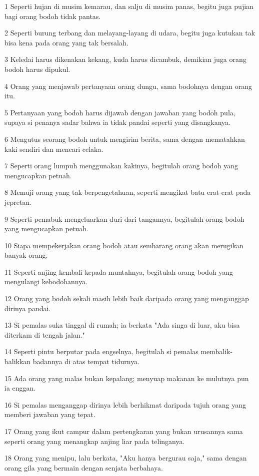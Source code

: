 \par 1 Seperti hujan di musim kemarau, dan salju di musim panas, begitu juga pujian bagi orang bodoh tidak pantas.
\par 2 Seperti burung terbang dan melayang-layang di udara, begitu juga kutukan tak bisa kena pada orang yang tak bersalah.
\par 3 Keledai harus dikenakan kekang, kuda harus dicambuk, demikian juga orang bodoh harus dipukul.
\par 4 Orang yang menjawab pertanyaan orang dungu, sama bodohnya dengan orang itu.
\par 5 Pertanyaan yang bodoh harus dijawab dengan jawaban yang bodoh pula, supaya si penanya sadar bahwa ia tidak pandai seperti yang disangkanya.
\par 6 Mengutus seorang bodoh untuk mengirim berita, sama dengan mematahkan kaki sendiri dan mencari celaka.
\par 7 Seperti orang lumpuh menggunakan kakinya, begitulah orang bodoh yang mengucapkan petuah.
\par 8 Memuji orang yang tak berpengetahuan, seperti mengikat batu erat-erat pada jepretan.
\par 9 Seperti pemabuk mengeluarkan duri dari tangannya, begitulah orang bodoh yang mengucapkan petuah.
\par 10 Siapa mempekerjakan orang bodoh atau sembarang orang akan merugikan banyak orang.
\par 11 Seperti anjing kembali kepada muntahnya, begitulah orang bodoh yang mengulangi kebodohannya.
\par 12 Orang yang bodoh sekali masih lebih baik daripada orang yang menganggap dirinya pandai.
\par 13 Si pemalas suka tinggal di rumah; ia berkata "Ada singa di luar, aku bisa diterkam di tengah jalan."
\par 14 Seperti pintu berputar pada engselnya, begitulah si pemalas membalik-balikkan badannya di atas tempat tidurnya.
\par 15 Ada orang yang malas bukan kepalang; menyuap makanan ke mulutnya pun ia enggan.
\par 16 Si pemalas menganggap dirinya lebih berhikmat daripada tujuh orang yang memberi jawaban yang tepat.
\par 17 Orang yang ikut campur dalam pertengkaran yang bukan urusannya sama seperti orang yang menangkap anjing liar pada telinganya.
\par 18 Orang yang menipu, lalu berkata, "Aku hanya bergurau saja," sama dengan orang gila yang bermain dengan senjata berbahaya.
